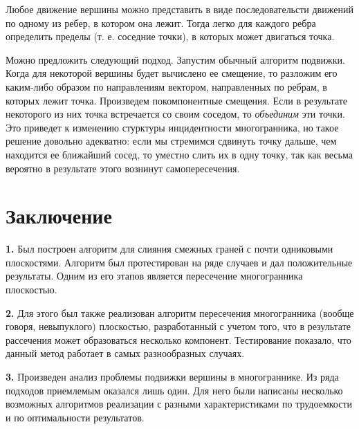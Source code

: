 \documentclass[a4paper,12pt, titlepage]{article}
\begin{document}
\begin{flushleft}
      Любое движение вершины можно представить в виде последовательсти
движений по одному из ребер, в котором она лежит. Тогда легко для каждого
ребра определить пределы (т. е. соседние точки), в которых может двигаться
точка.
\end{flushleft}

\begin{flushleft}
      Можно предложить следующий подход. Запустим обычный алгоритм подвижки.
Когда для некоторой вершины будет вычислено ее смещение, то разложим его каким-либо
образом по направлениям вектором, направленных по ребрам, в которых
лежит точка. Произведем покомпонентные смещения. Если в результате некоторого из них
точка встречается со своим соседом, то \textit{объединим} эти точки. Это приведет
к изменению стурктуры инцидентности многогранника, но такое решение довольно адекватно:
если мы стремимся сдвинуть точку дальше, чем находится ее ближайший сосед, то уместно 
слить их в одну точку, так как весьма вероятно в результате этого вознинут самопересечения.
\end{flushleft}

\newpage
\section{Заключение}

\begin{flushleft}
    \textbf{1.} Был построен алгоритм для слияния смежных граней с почти одниковыми плоскостями.
Алгоритм был протестирован на ряде случаев и дал положительные результаты. Одним из его этапов
является пересечение многогранника плоскостью.
\end{flushleft}

\begin{flushleft}
    \textbf{2.} Для этого был также реализован алгоритм пересечения многогранника (вообще говоря,
невыпуклого) плоскостью, разработанный с учетом того, что в результате рассечения может образоваться
несколько компонент. Тестирование показало, что данный метод работает в самых разнообразных случаях.
\end{flushleft}

\begin{flushleft}
    \textbf{3.} Произведен анализ проблемы подвижки вершины в многограннике.
Из ряда подходов приемлемым оказался лишь один. Для него были написаны несколько
возможных алгоритмов реализации с разными характеристиками по трудоемкости и по 
оптимальности результатов.
\end{flushleft}
\end{document}
